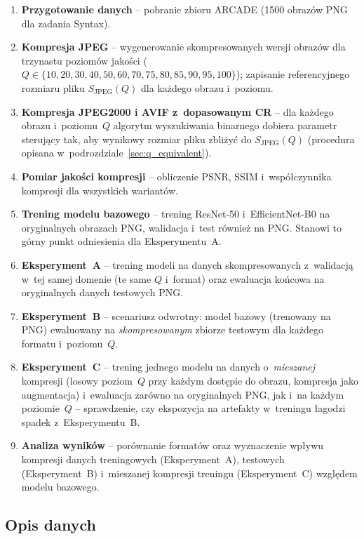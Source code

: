 \documentclass[12pt,a4paper]{article}
\begin{document}
\begin{enumerate}
    \item \textbf{Przygotowanie danych} -- pobranie zbioru ARCADE (1500 obrazów PNG dla zadania Syntax).
    \item \textbf{Kompresja JPEG} -- wygenerowanie skompresowanych wersji obrazów dla trzynastu poziomów jakości ($Q \in \{10, 20, 30, 40, 50, 60, 70, 75, 80, 85, 90, 95, 100\}$); zapisanie referencyjnego rozmiaru pliku $S_{\text{JPEG}}(Q)$ dla każdego obrazu i~poziomu.
    \item \textbf{Kompresja JPEG2000 i AVIF z~dopasowanym CR} -- dla każdego obrazu i~poziomu~$Q$ algorytm wyszukiwania binarnego dobiera parametr sterujący tak, aby wynikowy rozmiar pliku zbliżyć do $S_{\text{JPEG}}(Q)$ (procedura opisana w~podrozdziale~\ref{sec:q_equivalent}).
    \item \textbf{Pomiar jakości kompresji} -- obliczenie PSNR, SSIM i~współczynnika kompresji dla wszystkich wariantów.
    \item \textbf{Trening modelu bazowego} -- trening ResNet-50 i~EfficientNet-B0 na oryginalnych obrazach PNG, walidacja i~test również na PNG. Stanowi to górny punkt odniesienia dla Eksperymentu~A.
    \item \textbf{Eksperyment~A} -- trening modeli na danych skompresowanych z~walidacją w~tej samej domenie (te same $Q$ i~format) oraz ewaluacja końcowa na oryginalnych danych testowych PNG.
    \item \textbf{Eksperyment~B} -- scenariusz odwrotny: model bazowy (trenowany na PNG) ewaluowany na \emph{skompresowanym} zbiorze testowym dla każdego formatu i~poziomu~$Q$.
    \item \textbf{Eksperyment~C} -- trening jednego modelu na danych o~\emph{mieszanej} kompresji (losowy poziom~$Q$ przy każdym dostępie do obrazu, kompresja jako augmentacja) i~ewaluacja zarówno na oryginalnych PNG, jak i~na każdym poziomie~$Q$ -- sprawdzenie, czy ekspozycja na artefakty w~treningu łagodzi spadek z~Eksperymentu~B.
    \item \textbf{Analiza wyników} -- porównanie formatów oraz wyznaczenie wpływu kompresji danych treningowych (Eksperyment~A), testowych (Eksperyment~B) i~mieszanej kompresji treningu (Eksperyment~C) względem modelu bazowego.
\end{enumerate}

\subsection{Opis danych}
\end{document}
